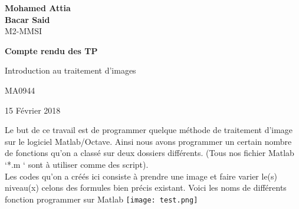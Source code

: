 \documentclass[12pt,a4paper,notitlepage]{report}
\begin{document}
\begin{Large}
\textbf{Mohamed Attia}\\
\indent\textbf{Bacar Said}\\

M2-MMSI
\end{Large}

\begin{center}
\begin{huge}
\vspace{6cm}
\textbf{Compte rendu des TP}\\
\vspace{1cm}

Introduction au traitement d'images
\end{huge}

\begin{LARGE}

\vspace{0.5cm} MA0944
\end{LARGE}

\vspace{8cm}
\begin{large}
15 Février 2018

\end{large}
\end{center}

\newpage
Le but de ce travail est de programmer quelque méthode de traitement d’image sur le logiciel Matlab/Octave. Ainsi nous avons programmer un certain nombre de fonctions qu’on a classé sur deux dossiers différents. (Tous nos fichier Matlab ‘*.m ‘ sont à utiliser comme des script).
\\
Les codes qu’on a créés ici consiste à prendre une image et faire varier le(s) niveau(x) celons des formules bien précis existant.
Voici les noms de différents fonction programmer sur Matlab
	\texttt{[image: test.png]}
\end{document}
